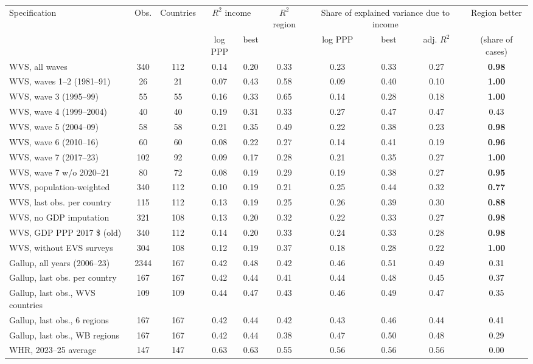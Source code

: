 \begin{tabular}{lccccccccc}
\toprule
Specification & Obs. & Countries & \multicolumn{2}{c}{$R^2$ income} & $R^2$ region & \multicolumn{3}{c}{Share of explained variance due to income} & Region better \\ & & & log PPP & best & & log PPP & best & adj. $R^2$ & (share of cases) \\
\midrule
WVS, all waves & 340 & 112 & 0.14 & 0.20 & 0.33 & 0.23 & 0.33 & 0.27 & \textbf{0.98} \\
WVS, waves 1--2 (1981--91) & 26 & 21 & 0.07 & 0.43 & 0.58 & 0.09 & 0.40 & 0.10 & \textbf{1.00} \\
WVS, wave 3 (1995--99) & 55 & 55 & 0.16 & 0.33 & 0.65 & 0.14 & 0.28 & 0.18 & \textbf{1.00} \\
WVS, wave 4 (1999--2004) & 40 & 40 & 0.19 & 0.31 & 0.33 & 0.27 & 0.47 & 0.47 & 0.43 \\
WVS, wave 5 (2004--09) & 58 & 58 & 0.21 & 0.35 & 0.49 & 0.22 & 0.38 & 0.23 & \textbf{0.98} \\
WVS, wave 6 (2010--16) & 60 & 60 & 0.08 & 0.22 & 0.27 & 0.14 & 0.41 & 0.19 & \textbf{0.96} \\
WVS, wave 7 (2017--23) & 102 & 92 & 0.09 & 0.17 & 0.28 & 0.21 & 0.35 & 0.27 & \textbf{1.00} \\
WVS, wave 7 w/o 2020--21 & 80 & 72 & 0.08 & 0.19 & 0.29 & 0.19 & 0.38 & 0.27 & \textbf{0.95} \\
WVS, population-weighted & 340 & 112 & 0.10 & 0.19 & 0.21 & 0.25 & 0.44 & 0.32 & \textbf{0.77} \\
WVS, last obs. per country & 115 & 112 & 0.13 & 0.19 & 0.25 & 0.26 & 0.39 & 0.30 & \textbf{0.88} \\
WVS, no GDP imputation & 321 & 108 & 0.13 & 0.20 & 0.32 & 0.22 & 0.33 & 0.27 & \textbf{0.98} \\
WVS, GDP PPP 2017 \$ (old) & 340 & 112 & 0.14 & 0.20 & 0.33 & 0.24 & 0.33 & 0.28 & \textbf{0.98} \\
WVS, without EVS surveys & 304 & 108 & 0.12 & 0.19 & 0.37 & 0.18 & 0.28 & 0.22 & \textbf{1.00} \\
\midrule
Gallup, all years (2006--23) & 2344 & 167 & 0.42 & 0.48 & 0.42 & 0.46 & 0.51 & 0.49 & 0.31 \\
Gallup, last obs. per country & 167 & 167 & 0.42 & 0.44 & 0.41 & 0.44 & 0.48 & 0.45 & 0.37 \\
Gallup, last obs., WVS countries & 109 & 109 & 0.44 & 0.47 & 0.43 & 0.46 & 0.49 & 0.47 & 0.35 \\
Gallup, last obs., 6 regions & 167 & 167 & 0.42 & 0.44 & 0.42 & 0.43 & 0.46 & 0.44 & 0.41 \\
Gallup, last obs., WB regions & 167 & 167 & 0.42 & 0.44 & 0.38 & 0.47 & 0.50 & 0.48 & 0.29 \\
WHR, 2023--25 average & 147 & 147 & 0.63 & 0.63 & 0.55 & 0.56 & 0.56 & 0.56 & 0.00 \\
\bottomrule
\end{tabular}
